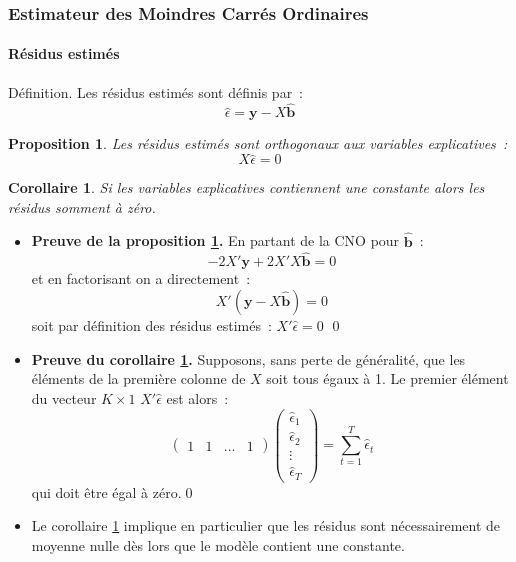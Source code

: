 \documentclass[10pt]{beamer}
\theoremstyle{plain}
\newenvironment{defn}[1]
{\bgroup \small\begin{block}{Définition. #1}}
  {\end{block}\egroup}
\newtheorem{prop}{Proposition}
\newtheorem{cor}{Corollaire}
\begin{document}

\begin{frame}
  \frametitle{Estimateur des Moindres Carrés Ordinaires}
  \framesubtitle{Résidus estimés}

  \begin{defn}{}
    Les résidus estimés sont définis par~:
    \[
      \hat{\epsilon}  = \mathbf y - X \hat{\mathbf b}
    \]
  \end{defn}

  \bigskip

  \begin{prop}\label{prop:orthogonal_residuals}
    Les résidus estimés sont orthogonaux aux variables explicatives~:
    \[
    X\hat\epsilon = 0
  \]
  \end{prop}

  \bigskip

  \begin{cor}\label{cor:zero_mean_residuals}
    Si les variables explicatives contiennent une constante alors les résidus somment à zéro.
  \end{cor}

\end{frame}

\begin{notes}
  \begin{itemize}

      \item \textbf{Preuve de la proposition \ref{prop:orthogonal_residuals}.} En partant de la CNO pour $\hat{\mathbf b}$~:
  \[
    -2X'\mathbf y + 2 X'X \hat{\mathbf b} = 0
  \]
  et en factorisant on a directement~:
    \[
      X'(\mathbf y - X \hat{\mathbf b}) = 0
    \]
    soit par définition des résidus estimés~:  $X'\hat\epsilon = 0$ \qed\newline

    \item \textbf{Preuve du corollaire \ref{cor:zero_mean_residuals}.} Supposons, sans perte de généralité, que les éléments de la première colonne de $X$ soit tous égaux à 1. Le premier élément du vecteur $K\times 1$ $X'\hat\epsilon$ est alors~:
    \[
      \begin{pmatrix}
        1 & 1 & \ldots & 1
      \end{pmatrix}
      \begin{pmatrix}
        \hat\epsilon_1\\
        \hat\epsilon_2\\
        \vdots\\
        \hat\epsilon_T
      \end{pmatrix} = \sum_{t=1}^T\hat\epsilon_t
    \]
    qui doit être égal à zéro.\qed\newline

  \item Le corollaire \ref{cor:zero_mean_residuals} implique en particulier que les
      résidus sont nécessairement de moyenne nulle dès lors que le modèle contient
      une constante.

  \end{itemize}
\end{notes}
\end{document}
